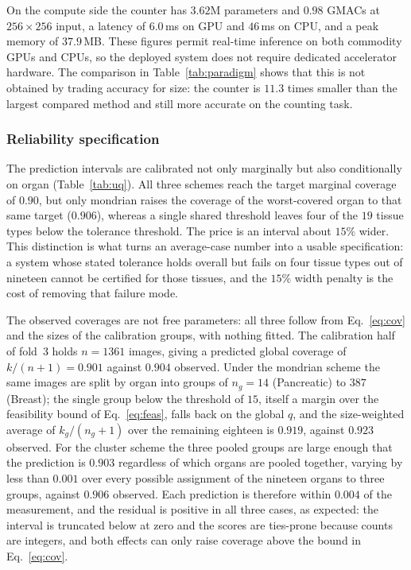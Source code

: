 \documentclass[preprint,12pt]{elsarticle}
\begin{document}
On the compute side the counter has $3.62$M parameters and $0.98$ GMACs at $256\times256$ input, a latency of
$6.0$\,ms on GPU and $46$\,ms on CPU, and a peak memory of $37.9$\,MB. These figures permit real-time inference
on both commodity GPUs and CPUs, so the deployed system does not require dedicated accelerator hardware. The
comparison in Table~\ref{tab:paradigm} shows that this is not obtained by trading accuracy for size: the
counter is $11.3$ times smaller than the largest compared method and still more accurate on the counting task.

\subsubsection{Reliability specification}\label{sec:uq}
The prediction intervals are calibrated not only marginally but also conditionally on organ
(Table~\ref{tab:uq}). All three schemes reach the target marginal coverage of $0.90$, but only mondrian raises
the coverage of the worst-covered organ to that same target ($0.906$), whereas a single shared threshold leaves
four of the $19$ tissue types below the tolerance threshold. The price is an interval about $15\%$ wider. This
distinction is what turns an average-case number into a usable specification: a system whose stated tolerance
holds overall but fails on four tissue types out of nineteen cannot be certified for those tissues, and the
$15\%$ width penalty is the cost of removing that failure mode.

The observed coverages are not free parameters: all three follow from Eq.~\eqref{eq:cov} and the sizes of the
calibration groups, with nothing fitted. The calibration half of fold~3 holds $n = 1361$ images, giving a
predicted global coverage of $k/(n+1) = 0.901$ against $0.904$ observed. Under the mondrian scheme the same
images are split by organ into groups of $n_g = 14$ (Pancreatic) to $387$ (Breast); the single group below the
threshold of $15$, itself a margin over the feasibility bound of Eq.~\eqref{eq:feas}, falls back on the global
$q$, and the size-weighted average of $k_g/(n_g+1)$ over the
remaining eighteen is $0.919$, against $0.923$ observed. For the cluster scheme the three pooled groups are
large enough that the prediction is $0.903$ regardless of which organs are pooled together, varying by less
than $0.001$ over every possible assignment of the nineteen organs to three groups, against $0.906$ observed.
Each prediction is therefore within $0.004$ of the measurement, and the residual is positive in all three
cases, as expected: the interval is truncated below at zero and the scores are ties-prone because counts are
integers, and both effects can only raise coverage above the bound in Eq.~\eqref{eq:cov}.
\end{document}

